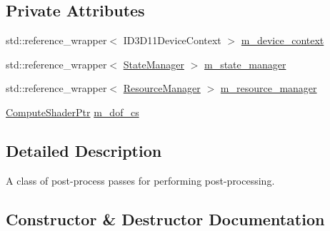 \subsection*{Private Attributes}
\begin{DoxyCompactItemize}
\item 
std\+::reference\+\_\+wrapper$<$ I\+D3\+D11\+Device\+Context $>$ \hyperlink{classmage_1_1rendering_1_1_post_process_pass_a18468bc4ffa408e9db3089b306f45291}{m\+\_\+device\+\_\+context}
\item 
std\+::reference\+\_\+wrapper$<$ \hyperlink{classmage_1_1rendering_1_1_state_manager}{State\+Manager} $>$ \hyperlink{classmage_1_1rendering_1_1_post_process_pass_a80cbe6aee950e5bcc98763813fdb8aba}{m\+\_\+state\+\_\+manager}
\item 
std\+::reference\+\_\+wrapper$<$ \hyperlink{classmage_1_1rendering_1_1_resource_manager}{Resource\+Manager} $>$ \hyperlink{classmage_1_1rendering_1_1_post_process_pass_af20e46967d28e7e0500fff6b1988ad80}{m\+\_\+resource\+\_\+manager}
\item 
\hyperlink{namespacemage_1_1rendering_ab3dc9f2114f2e9255b91d9c051da52ea}{Compute\+Shader\+Ptr} \hyperlink{classmage_1_1rendering_1_1_post_process_pass_aec72e5a7ca28c11754f85ab6726ce5ec}{m\+\_\+dof\+\_\+cs}
\end{DoxyCompactItemize}


\subsection{Detailed Description}
A class of post-\/process passes for performing post-\/processing. 

\subsection{Constructor \& Destructor Documentation}
\hypertarget{classmage_1_1rendering_1_1_post_process_pass_aa7989cc618c40d64e6e86f1aa8576dff}{}\label{classmage_1_1rendering_1_1_post_process_pass_aa7989cc618c40d64e6e86f1aa8576dff} 
